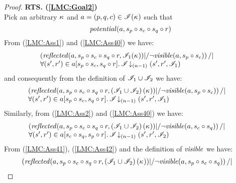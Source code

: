 \begin{lemma}
\begin{proof}
\noindent\textbf{RTS. (\ref{LMC:Goal2})}\\
Pick an arbitrary $\kappa_{}$ and $a = (p, q, c) \in\mathscr{I}(\kappa_{})$ such that
\begin{equation}
	\mathit{potential}(a, s_p \circ s_c \circ s_q \circ r) \label{LMC:Ass40}
\end{equation}
From (\ref{LMC:Ass1}) and (\ref{LMC:Ass40}) we have: 
%
\begin{align*}
	& 
	\begin{array}{@{} l @{}}
		\left( \m{reflected}(a,s_p \composeL s_c \composeL s_q \composeL r,\lmod_1(\ca{})) |/ \neg\m{visible}(a,s_p \composeL s_c) \right) /| \\
		\for{(s', r') \in a[s_p \composeL s_c, s_q \composeL r]} \extendsAMUpto{\lmod}{(n-1)}{s'}{r'}{\lmod_1}
	\end{array}	  
\end{align*}
%
and consequently from the definition of $\mathscr{I}_1 \cup \mathscr{I}_2$ we have: 
%
\begin{align}
	& \begin{array}{@{} l @{}}
		\left( \m{reflected}(a,s_p \composeL s_c \composeL s_q \composeL r, \left(\lmod_1 \cup \lmod_2 \right)(\ca{})) |/ \neg\m{visible}(a,s_p \composeL s_c) \right) /| \\
		\for{(s', r') \in a[s_p \composeL s_c, s_q \composeL r]} \extendsAMUpto{\lmod}{(n-1)}{s'}{r'}{\lmod_1}
	\end{array}	  \label{LMC:Ass41}
\end{align}
Similarly, from (\ref{LMC:Ass2}) and (\ref{LMC:Ass40}) we have: 
%
\begin{align}
	& \begin{array}{@{} l @{}}
		\left( \m{reflected}(a,s_p \composeL s_c \composeL s_q \composeL r, \left(\lmod_1 \cup \lmod_2 \right)(\ca{})) |/ \neg\m{visible}(a,s_c \composeL s_q) \right) /| \\
		\for{(s', r') \in a[s_c \composeL s_q, s_p \composeL r]} \extendsAMUpto{\lmod}{(n-1)}{s'}{r'}{\lmod_2}
	\end{array} \label{LMC:Ass42}
\end{align}
From (\ref{LMC:Ass41}), (\ref{LMC:Ass42}) and the definition of $\mathit{visible}$ we have: 
%
\begin{align}
	& \begin{array}{@{} l @{}}
		\left( \m{reflected}(a,s_p \composeL s_c \composeL s_q \composeL r, \left(\lmod_1 \cup \lmod_2 \right)(\ca{})) |/ \neg\m{visible}(a,s_p \composeL s_c \composeL s_q) \right) /| \\

\end{array}
\end{align}
\end{proof}
\end{lemma}
